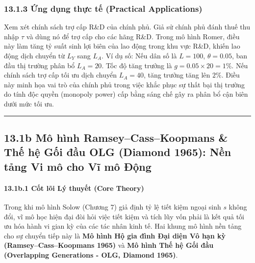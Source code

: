 \documentclass[
]{article}
\begin{document}
\subsubsection{13.1.3 Ứng dụng thực tế (Practical
Applications)}\label{ux1ee9ng-dux1ee5ng-thux1ef1c-tux1ebf-practical-applications-46}

Xem xét chính sách trợ cấp R\&D của chính phủ. Giả sử chính phủ đánh
thuế thu nhập \(\tau\) và dùng nó để trợ cấp cho các hãng R\&D. Trong mô
hình Romer, điều này làm tăng tỷ suất sinh lợi biên của lao động trong
khu vực R\&D, khiến lao động dịch chuyển từ \(L_Y\) sang \(L_A\). Ví dụ
số: Nếu dân số là \(L = 100\), \(\theta = 0.05\), ban đầu thị trường
phân bổ \(L_A = 20\). Tốc độ tăng trưởng là
\(g = 0.05 \times 20 = 1\%\). Nếu chính sách trợ cấp tối ưu dịch chuyển
\(L_A = 40\), tăng trưởng tăng lên \(2\%\). Điều này minh họa vai trò
của chính phủ trong việc khắc phục sự thất bại thị trường do tính độc
quyền (monopoly power) cấp bằng sáng chế gây ra phân bổ cận biên dưới
mức tối ưu.

\begin{center}\rule{0.5\linewidth}{0.5pt}\end{center}

\subsection{13.1b Mô hình Ramsey--Cass--Koopmans \& Thế hệ Gối đầu OLG
(Diamond 1965): Nền tảng Vi mô cho Vĩ mô
Động}\label{b-muxf4-huxecnh-ramseycasskoopmans-thux1ebf-hux1ec7-gux1ed1i-ux111ux1ea7u-olg-diamond-1965-nux1ec1n-tux1ea3ng-vi-muxf4-cho-vux129-muxf4-ux111ux1ed9ng}

\paragraph{13.1b.1 Cốt lõi Lý thuyết (Core
Theory)}\label{b.1-cux1ed1t-luxf5i-luxfd-thuyux1ebft-core-theory}

Trong khi mô hình Solow (Chương 7) giả định tỷ lệ tiết kiệm ngoại sinh
\(s\) không đổi, vĩ mô học hiện đại đòi hỏi việc tiết kiệm và tích lũy
vốn phải là kết quả tối ưu hóa hành vi gian kỳ của các tác nhân kinh tế.
Hai khung mô hình nền tảng cho sự chuyển tiếp này là \textbf{Mô hình Hộ
gia đình Đại diện Vô hạn kỳ (Ramsey--Cass--Koopmans 1965)} và \textbf{Mô
hình Thế hệ Gối đầu (Overlapping Generations - OLG, Diamond 1965)}.
\end{document}

